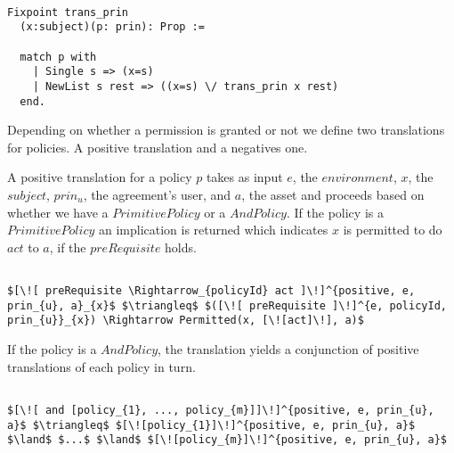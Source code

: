 \begin{lstlisting}

Fixpoint trans_prin
  (x:subject)(p: prin): Prop :=

  match p with
    | Single s => (x=s)
    | NewList s rest => ((x=s) \/ trans_prin x rest)
  end.
\end{lstlisting}


Depending on whether a permission is granted or not we define two translations for policies. A positive translation and a negatives one. 

A positive translation for a policy $p$ takes as input $e$, the $environment$, $x$, the $subject$, $prin_{u}$, the agreement's user, and $a$, the asset and proceeds based on whether we have a $PrimitivePolicy$ or a $AndPolicy$. If the policy is a $PrimitivePolicy$ an implication is returned which indicates $x$ is permitted to do $act$ to $a$, if the $preRequisite$ holds.


\lstset{mathescape, language=AST}  
\begin{lstlisting}[frame=single, caption={Positive Policy Translation {$\colon$} Single policy},label={lst:transpolicypositiveSingle}]

$[\![ preRequisite \Rightarrow_{policyId} act ]\!]^{positive, e, prin_{u}, a}_{x}$ $\triangleq$ $([\![ preRequisite ]\!]^{e, policyId, prin_{u}}_{x}) \Rightarrow Permitted(x, [\![act]\!], a)$

\end{lstlisting}

If the policy is a $AndPolicy$, the translation yields a conjunction of positive translations of each policy in turn.

\lstset{mathescape, language=AST}  
\begin{lstlisting}[frame=single, caption={Positive Policy Translation {$\colon$} List of policies},label={lst:transpolicypositiveListOfPolicies}]

$[\![ and [policy_{1}, ..., policy_{m}]]\!]^{positive, e, prin_{u}, a}$ $\triangleq$ $[\![policy_{1}]\!]^{positive, e, prin_{u}, a}$ $\land$ $...$ $\land$ $[\![policy_{m}]\!]^{positive, e, prin_{u}, a}$

\end{lstlisting}



